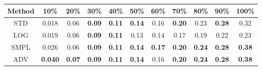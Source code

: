 \documentclass{standalone}
\begin{document}
\begin{tabular}{c|cccccccccc}
      \toprule
      Method & 10\% & 20\% & 30\% & 40\% & 50\% & 60\% & 70\% & 80\% & 90\% & 100\% \\
      \midrule
STD & 0.018 & 0.06 & \textbf{0.09} & \textbf{0.11} & \textbf{0.14} & 0.16 & \textbf{0.20} & 0.23 & \textbf{0.28} & 0.32\\
LOG & 0.019 & 0.06 & \textbf{0.09} & \textbf{0.11} & 0.13 & 0.14 & 0.17 & 0.19 & 0.22 & 0.23\\
SMPL & 0.026 & 0.06 & \textbf{0.09} & \textbf{0.11} & \textbf{0.14} & \textbf{0.17} & \textbf{0.20} & \textbf{0.24} & \textbf{0.28} & \textbf{0.38}\\
ADV & \textbf{0.040} & \textbf{0.07} & \textbf{0.09} & \textbf{0.11} & \textbf{0.14} & 0.16 & \textbf{0.20} & \textbf{0.24} & \textbf{0.28} & \textbf{0.38}\\
  \bottomrule
\end{tabular}
\end{document}

